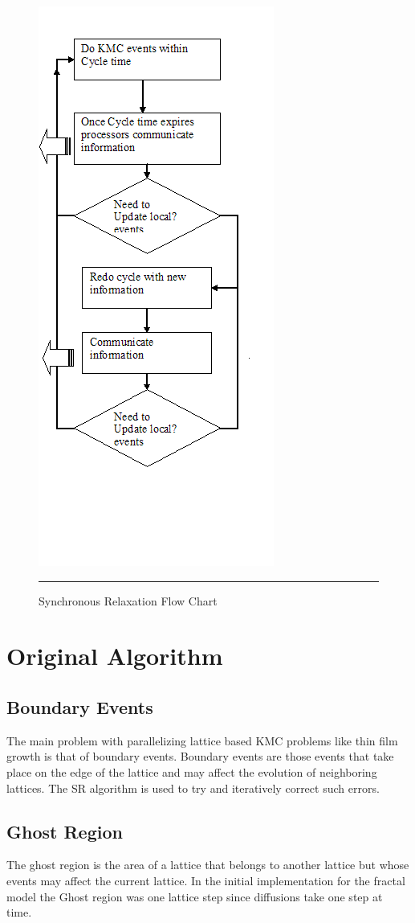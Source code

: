 \begin{figure}
{\includegraphics{srleft}}
\hrule
\caption{Synchronous Relaxation Flow Chart}
\end{figure}

\section{Original Algorithm}

\subsection{Boundary Events}
The main problem with parallelizing lattice based KMC problems like thin film growth is that of boundary events. Boundary events are those events that take place on the edge of the lattice and may affect the evolution of neighboring lattices. The SR algorithm is used to try and iteratively correct such errors.

\subsection{Ghost Region}
The ghost region is the area of a lattice that belongs to another lattice but whose events may affect the current lattice. In the initial implementation for the fractal model the Ghost region was one lattice step since diffusions take one step at time.

